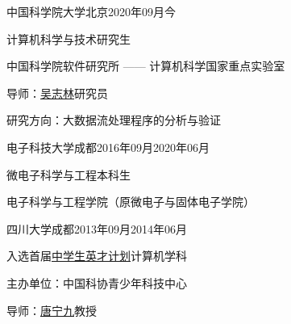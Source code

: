 
\begin{eduitem}{中国科学院大学}{北京}{2020年09月}{今}
    \item 计算机科学与技术研究生
    \item 中国科学院软件研究所 —— 计算机科学国家重点实验室
    \item 导师：\href{http://lcs.ios.ac.cn/~wuzl/}{吴志林}研究员
    \item 研究方向：大数据流处理程序的分析与验证
\end{eduitem}

\begin{eduitem}{电子科技大学}{成都}{2016年09月}{2020年06月}
\item 微电子科学与工程本科生
\item 电子科学与工程学院（原微电子与固体电子学院）
\end{eduitem}

\begin{eduitem}{四川大学}{成都}{2013年09月}{2014年06月}
\item 入选首届\href{https://www.ycjh.org.cn/}{中学生英才计划}计算机学科
\item 主办单位：中国科协青少年科技中心
\item 导师：\href{http://cs.scu.edu.cn/info/1074/3930.htm}{唐宁九}教授
\end{eduitem}


\endinput